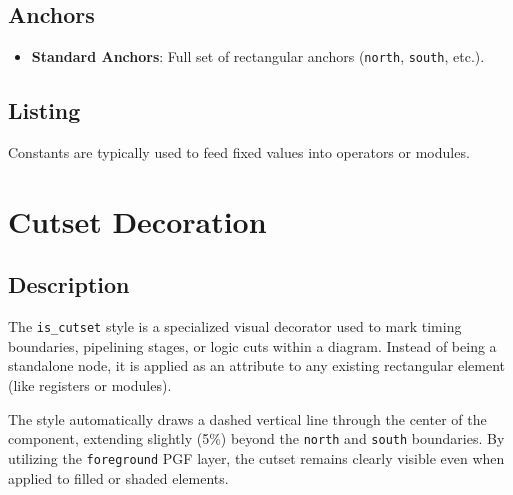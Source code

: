     \subsection{\sffamily Anchors}
        \begin{itemize}
            \item \textbf{Standard Anchors}: Full set of rectangular anchors (\texttt{north}, \texttt{south}, etc.).
        \end{itemize}

    \subsection{\sffamily Listing}
        Constants are typically used to feed fixed values into operators or modules.

\begin{RTLexample}
\end{RTLexample}

\section{\sffamily Cutset Decoration}

    \subsection{\sffamily Description}
        The \texttt{is\_cutset} style is a specialized visual decorator used to mark timing boundaries, pipelining stages, or logic cuts within a diagram. Instead of being a standalone node, it is applied as an attribute to any existing rectangular element (like registers or modules).
        
        The style automatically draws a dashed vertical line through the center of the component, extending slightly (5\%) beyond the \texttt{north} and \texttt{south} boundaries. By utilizing the \texttt{foreground} PGF layer, the cutset remains clearly visible even when applied to filled or shaded elements.

